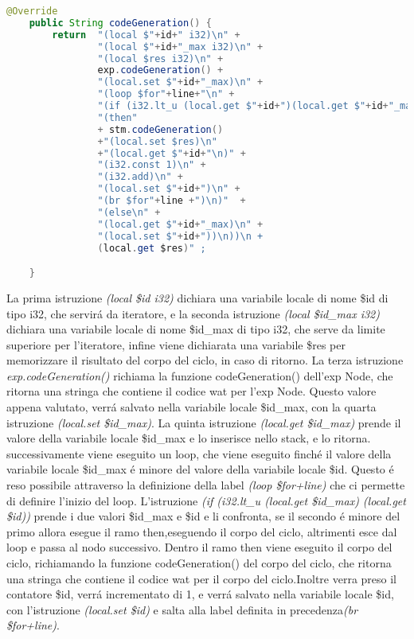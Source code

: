 \documentclass[../../main.tex]{subfiles}
\begin{document}
\begin{lstlisting}[language=Java, caption={codeGeneration() per il for Node}, label={lst:codeGenerationFor}]
    @Override
    public String codeGeneration() {
        return  "(local $"+id+" i32)\n" +
                "(local $"+id+"_max i32)\n" +
                "(local $res i32)\n" +
                exp.codeGeneration() +  
                "(local.set $"+id+"_max)\n" +
                "(loop $for"+line+"\n" +      
                "(if (i32.lt_u (local.get $"+id+")(local.get $"+id+"_max) )\n"+ 
                "(then"
                + stm.codeGeneration()          
                +"(local.set $res)\n"           
                +"(local.get $"+id+"\n)" +     
                "(i32.const 1)\n" +             
                "(i32.add)\n" +                 
                "(local.set $"+id+")\n" +       
                "(br $for"+line +")\n)"  +
                "(else\n" +                       
                "(local.get $"+id+"_max)\n" +   
                "(local.set $"+id+"))\n))\n +
                (local.get $res)" ;      

    }

\end{lstlisting}

La prima istruzione \textit{(local \$id i32)} dichiara una variabile locale di nome \$id di tipo i32, che servirá da iteratore, e la seconda istruzione \textit{(local \$id\_max i32)} dichiara una variabile locale di nome \$id\_max di tipo i32, che serve da limite superiore per l'iteratore, infine viene dichiarata una variabile \$res per memorizzare il risultato del corpo del ciclo, in caso di ritorno.
La terza istruzione \textit{exp.codeGeneration()} richiama la funzione codeGeneration() dell'exp Node, che ritorna una stringa che contiene il codice wat per l'exp Node.
Questo valore appena valutato, verrá salvato nella variabile locale \$id\_max, con la quarta istruzione \textit{(local.set \$id\_max)}.
La quinta istruzione \textit{(local.get \$id\_max)} prende il valore della variabile locale \$id\_max e lo inserisce nello stack, e lo ritorna.
successivamente viene eseguito un loop, che viene eseguito finché il valore della variabile locale \$id\_max é minore del valore della variabile locale \$id.
Questo é reso possibile attraverso la definizione della label \textit{(loop \$for+line)} che ci permette di definire l'inizio del loop.
L'istruzione \textit{(if (i32.lt\_u (local.get \$id\_max) (local.get \$id))} prende i due valori \$id\_max e \$id e li confronta, se il secondo é minore del primo allora esegue il ramo then,eseguendo il corpo del ciclo, altrimenti esce dal loop e passa al nodo successivo.
Dentro il ramo then viene eseguito il corpo del ciclo, richiamando la funzione codeGeneration() del corpo del ciclo, che ritorna una stringa che contiene il codice wat per il corpo del ciclo.Inoltre verra preso il contatore \$id, verrá incrementato di 1, e verrá salvato nella variabile locale \$id, con l'istruzione \textit{(local.set \$id)} e salta alla label definita in precedenza\textit{(br \$for+line)}.
\end{document}
